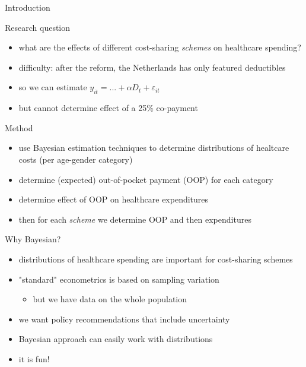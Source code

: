 \documentclass[presentation]{beamer}
\begin{document}
\begin{frame}[label={sec:org8a489c8}]{Introduction}
\begin{block}{Research question}
\begin{itemize}
\item what are the effects of different cost-sharing \emph{schemes} on healthcare spending?
\item difficulty: after the reform, the Netherlands has only featured deductibles
\item so we can estimate \(y_{it} = ... + \alpha D_t + \varepsilon_{it}\)
\item but cannot determine effect of a 25\% co-payment
\end{itemize}
\end{block}

\begin{block}{Method}
\begin{itemize}
\item use Bayesian estimation techniques to determine distributions of healtcare costs (per age-gender category)
\item determine (expected) out-of-pocket payment (OOP) for each category
\item determine effect of OOP on healthcare expenditures
\item then for each \emph{scheme} we determine OOP and then expenditures
\end{itemize}
\end{block}

\begin{block}{Why Bayesian?}
\begin{itemize}
\item distributions of healthcare spending are important for cost-sharing schemes
\item "standard" econometrics is based on sampling variation
\begin{itemize}
\item but we have data on the whole population
\end{itemize}
\item we want policy recommendations that include uncertainty
\item Bayesian approach can easily work with distributions
\item it is fun!
\end{itemize}
\end{block}


\end{frame}
\end{document}
